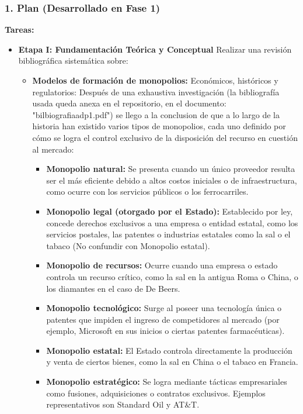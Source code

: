 \documentclass[a4paper,12pt]{article}
\begin{document}
\subsubsection*{1. Plan (Desarrollado en Fase 1)}
    \textbf{Tareas:}
\begin{itemize}
    \item \textbf{Etapa I: Fundamentación Teórica y Conceptual} Realizar una revisión bibliográfica sistemática sobre:
    \begin{itemize}
        \item \textbf{Modelos de formación de monopolios:} Económicos, históricos y regulatorios: Después de una exhaustiva investigación (la bibliografía usada queda anexa en el repositorio, en el documento: "bilbiografiaadp1.pdf") se llego a la conclusion de que a lo largo de la historia han existido varios tipos de monopolios, cada uno definido por cómo se logra el control exclusivo de la disposición del recurso en cuestión al mercado:
\begin{itemize}
    \item \textbf{Monopolio natural:} Se presenta cuando un único proveedor resulta ser el más eficiente debido a altos costos iniciales o de infraestructura, como ocurre con los servicios públicos o los ferrocarriles.

    \item \textbf{Monopolio legal (otorgado por el Estado):} Establecido por ley, concede derechos exclusivos a una empresa o entidad estatal, como los servicios postales, las patentes o industrias estatales como la sal o el tabaco (No confundir con Monopolio estatal).

    \item \textbf{Monopolio de recursos:} Ocurre cuando una empresa o estado controla un recurso crítico, como la sal en la antigua Roma o China, o los diamantes en el caso de De Beers.

    \item \textbf{Monopolio tecnológico:} Surge al poseer una tecnología única o patentes que impiden el ingreso de competidores al mercado (por ejemplo, Microsoft en sus inicios o ciertas patentes farmacéuticas).

    \item \textbf{Monopolio estatal:} El Estado controla directamente la producción y venta de ciertos bienes, como la sal en China o el tabaco en Francia.

    \item \textbf{Monopolio estratégico:} Se logra mediante tácticas empresariales como fusiones, adquisiciones o contratos exclusivos. Ejemplos representativos son Standard Oil y AT\&T.


\end{itemize}
\end{itemize}
\end{itemize}
\end{document}
